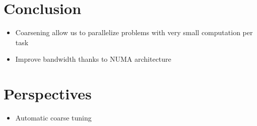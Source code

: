 \documentclass[oneside,12t]{classes/Thesis}
\begin{document}
\section{Conclusion}
  \begin{itemize}
    \item Coarsening allow us to parallelize problems with very small computation per task
    \item Improve bandwidth thanks to NUMA architecture
  \end{itemize}


\section{Perspectives}
  \begin{itemize}
    \item Automatic coarse tuning
  \end{itemize}



\backmatter %
%
%
\appendix



\end{document}
